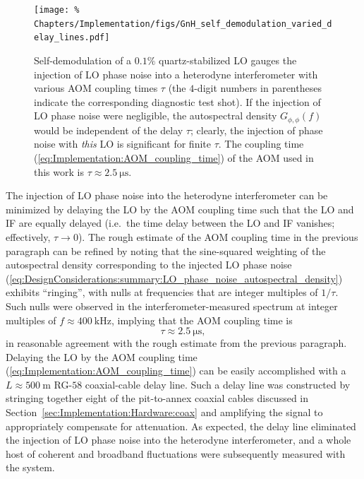 \begin{figure}
  \centering
  \texttt{[image: \%
    Chapters/Implementation/figs/GnH\_self\_demodulation\_varied\_delay\_lines.pdf]}
  \caption[Self-demodulation of a $0.1\%$ quartz-stabilized LO]{%
    Self-demodulation of a $0.1\%$ quartz-stabilized LO
    gauges the injection of LO phase noise
    into a heterodyne interferometer
    with various AOM coupling times $\tau$
    (the $4$-digit numbers in parentheses indicate
    the corresponding diagnostic test shot).
    If the injection of LO phase noise were negligible,
    the autospectral density $G_{\phi,\phi}(f)$
    would be independent of the delay $\tau$;
    clearly, the injection of phase noise with \emph{this} LO
    is significant for finite $\tau$.
    The coupling time (\ref{eq:Implementation:AOM_coupling_time})
    of the AOM used in this work is
    $\tau \approx \SI{2.5}{\micro\second}$.
  }
\label{fig:Implementation:GnH_self_demodulation}
\end{figure}

The injection of LO phase noise into the heterodyne interferometer
can be minimized by delaying the LO by the AOM coupling time
such that the LO and IF are equally delayed
(i.e.\ the time delay between the LO and IF vanishes;
effectively, $\tau \rightarrow 0$).
The rough estimate of the AOM coupling time in the previous paragraph
can be refined by noting that the sine-squared weighting
of the autospectral density corresponding to the injected LO phase noise
(\ref{eq:DesignConsiderations:summary:LO_phase_noise_autospectral_density})
exhibits ``ringing'', with nulls at
frequencies that are integer multiples of $1 / \tau$.
Such nulls were observed in the interferometer-measured spectrum
at integer multiples of $f \approx \SI{400}{\kilo\hertz}$,
implying that the AOM coupling time is
\begin{equation}
  \tau \approx \SI{2.5}{\micro\second},
  \label{eq:Implementation:AOM_coupling_time}
\end{equation}
in reasonable agreement with the rough estimate
from the previous paragraph.
Delaying the LO by the AOM coupling time
(\ref{eq:Implementation:AOM_coupling_time})
can be easily accomplished with
a $L \approx \SI{500}{\meter}$ {RG-$58$} coaxial-cable delay line.
Such a delay line was constructed by
stringing together eight of the pit-to-annex coaxial cables discussed in
Section~\ref{sec:Implementation:Hardware:coax} and
amplifying the signal to appropriately compensate for attenuation.
As expected, the delay line eliminated the injection of LO phase noise
into the heterodyne interferometer, and
a whole host of coherent and broadband fluctuations
were subsequently measured with the system.


